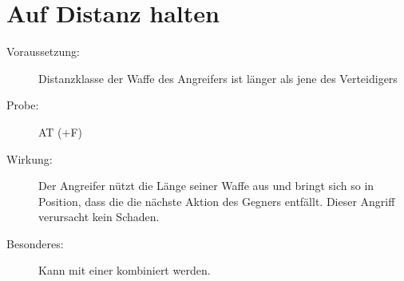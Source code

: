 \section{Auf Distanz halten}
\label{bAT.auf_distanz_halten}
\begin{description}
    \item[Voraussetzung:]
        Distanzklasse der Waffe des Angreifers ist länger als jene des Verteidigers
    \item[Probe:]
        AT (+F)
    \item[Wirkung:]
        Der Angreifer nützt die Länge seiner Waffe aus und bringt sich so in Position, dass die die nächste Aktion des Gegners entfällt.
        Dieser Angriff verursacht kein Schaden.
    \item[Besonderes:]
        Kann mit einer  kombiniert werden.
\end{description}
